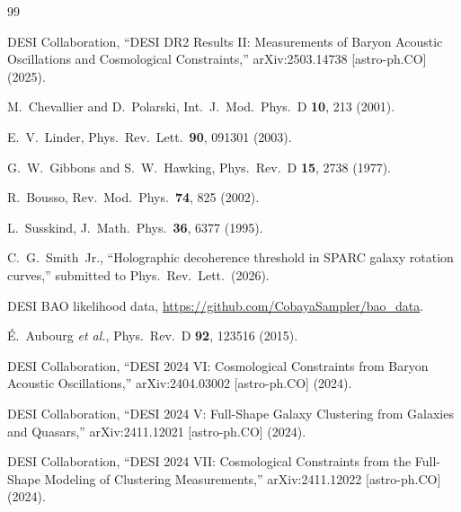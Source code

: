 \documentclass[aps,prl,twocolumn,showpacs,preprintnumbers,amsmath,amssymb,superscriptaddress]{revtex4-2}
\begin{document}
\begin{thebibliography}{99}

DESI Collaboration,
``DESI DR2 Results II: Measurements of Baryon Acoustic Oscillations and 
Cosmological Constraints,''
arXiv:2503.14738 [astro-ph.CO] (2025).

M.~Chevallier and D.~Polarski,
Int.\ J.\ Mod.\ Phys.\ D \textbf{10}, 213 (2001).

E.~V.~Linder,
Phys.\ Rev.\ Lett.\ \textbf{90}, 091301 (2003).

G.~W.~Gibbons and S.~W.~Hawking,
Phys.\ Rev.\ D \textbf{15}, 2738 (1977).

R.~Bousso,
Rev.\ Mod.\ Phys.\ \textbf{74}, 825 (2002).

L.~Susskind,
J.\ Math.\ Phys.\ \textbf{36}, 6377 (1995).

C.~G.~Smith~Jr.,
``Holographic decoherence threshold in SPARC galaxy rotation curves,''
submitted to Phys.\ Rev.\ Lett.\ (2026).

DESI BAO likelihood data,
\url{https://github.com/CobayaSampler/bao_data}.

\'E.~Aubourg \textit{et al.},
Phys.\ Rev.\ D \textbf{92}, 123516 (2015).

DESI Collaboration,
``DESI 2024 VI: Cosmological Constraints from Baryon Acoustic 
Oscillations,''
arXiv:2404.03002 [astro-ph.CO] (2024).

DESI Collaboration,
``DESI 2024 V: Full-Shape Galaxy Clustering from Galaxies and 
Quasars,''
arXiv:2411.12021 [astro-ph.CO] (2024).

DESI Collaboration,
``DESI 2024 VII: Cosmological Constraints from the Full-Shape 
Modeling of Clustering Measurements,''
arXiv:2411.12022 [astro-ph.CO] (2024).

\end{thebibliography}
\end{document}
